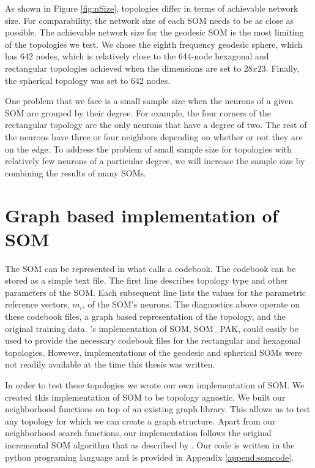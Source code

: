 As shown in Figure \ref{fig:nSize}, topologies differ in terms of achievable
network size.  For comparability, the network size of each SOM needs to be as
close as possible.  The achievable network size for the geodesic SOM is the
most limiting of the topologies we test. We chose the eighth frequency
geodesic sphere, which has 642 nodes, which is relatively close to the
644-node hexagonal and rectangular topologies achieved when the dimensions are
set to \(28x23\). Finally, the spherical topology was set to 642 nodes.

One problem that we face is a small sample size when the neurons of a given
SOM are grouped by their degree.  For example, the four corners of the
rectangular topology are the only neurons that have a degree of two.  The rest
of the neurons have three or four neighbors depending on whether or not they
are on the edge. To address the problem of small sample size for topologies
with relatively few neurons of a particular degree, we will increase
the sample size by combining the results of many SOMs.

\section{Graph based implementation of SOM}
\label{meth:som}
The SOM can be represented in what \cite{kohonen1996} calls a codebook.  The
codebook can be stored as a simple text file.  The first line describes topology type and
other parameters of the SOM.  Each subsequent line lists the values for the
parametric reference vectors, $m_i$, of the SOM's neurons.  The diagnostics
above operate on these codebook files, a graph based representation of the
topology, and the original training data.  \citeauthor{kohonen1996}'s
implementation of SOM, SOM\_PAK, could easily be used to provide the necessary
codebook files for the rectangular and hexagonal topologies.  However, 
implementations of the geodesic and spherical SOMs were not readily available at the
time this thesis was written.

In order to test these topologies we wrote our own implementation of SOM.  We
created this implementation of SOM to be topology agnostic.  We built our
neighborhood functions on top of an existing graph library.  This allows us to
test any topology for which we can create a graph structure.  Apart from our
neighborhood search functions, our implementation follows the original
incremental SOM algorithm that as described by \cite{Kohonen2000}.  Our code
is written in the python programing language and is provided in Appendix
\ref{append:somcode}.

